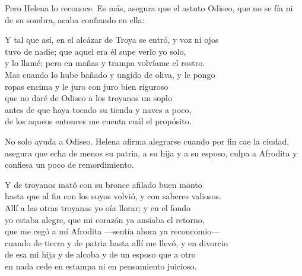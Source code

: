 Pero Helena lo reconoce. Es más, asegura que el astuto Odiseo, que no se fía ni de su sombra, acaba confiando en ella:

\begin{versocita}
Y tal que así, en el alcázar de Troya se entró, y voz ni ojos\\
tuvo de nadie; que aquel era él supe verlo yo solo,\\
y lo llamé; pero en mañas y trampa volvíame el rostro.\\
Mas cuando lo hube bañado y ungido de oliva, y le pongo\\
ropas encima y le juro con juro bien riguroso\\
que no daré de Odiseo a los troyanos un soplo\\
antes de que haya tocado su tienda y naves a poco,\\
de los aqueos entonces me cuenta cuál el propósito.
\end{versocita}

No solo ayuda a Odiseo. Helena afirma alegrarse cuando por fin cae la ciudad, asegura que echa de menos su patria, a su hija y a su esposo, culpa a Afrodita y confiesa un poco de remordimiento.

\begin{versocita}
Y de troyanos mató con su bronce afilado buen monto\\
hasta que al fin con los suyos volvió, y con saberes valiosos.\\
Allí a las otras troyanas yo oía llorar; y en el fondo\\
yo estaba alegre, que mi corazón ya ansiaba el retorno,\\
que me cegó a mí Afrodita ---sentía ahora ya reconcomio---\\
cuando de tierra y de patria hasta allí me llevó, y en divorcio\\
de esa mi hija y de alcoba y de un esposo que a otro\\
en nada cede en estampa ni en pensamiento juicioso.
\end{versocita}

